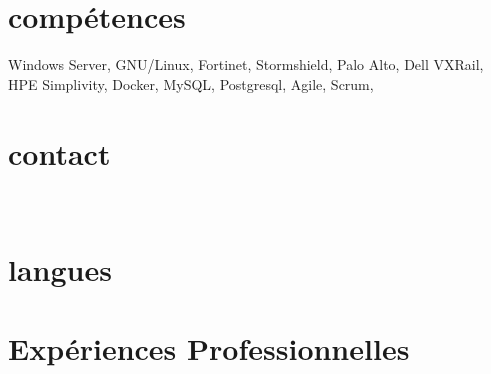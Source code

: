 \documentclass{friggeri-cv} 	%
\begin{document}


\begin{aside} %
\section{compétences}
Windows Server, GNU/Linux,
Fortinet, Stormshield, Palo Alto,
Dell VXRail, HPE Simplivity, Docker,
MySQL, Postgresql,
Agile, Scrum,
\section{contact}
\myAddress
~
\myPhoneNumber
\myReferences
\section{langues}
\myLanguages
\end{aside}

\section{Expériences Professionnelles}
\end{document}
